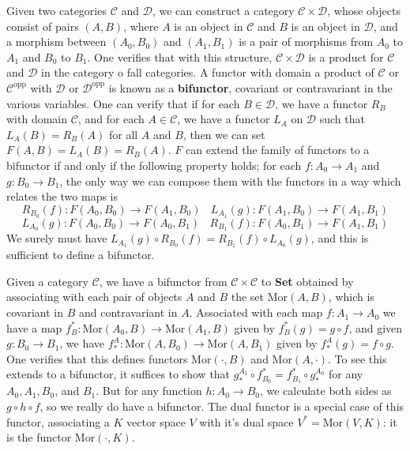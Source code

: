 Given two categories $\mathcal{C}$ and $\mathcal{D}$, we can construct a category $\mathcal{C} \times \mathcal{D}$, whose objects consist of pairs $(A,B)$, where $A$ is an object in $\mathcal{C}$ and $B$ is an object in $\mathcal{D}$, and a morphism between $(A_0, B_0)$ and $(A_1,B_1)$ is a pair of morphisms from $A_0$ to $A_1$ and $B_0$ to $B_1$. One verifies that with this structure, $\mathcal{C} \times \mathcal{D}$ is a product for $\mathcal{C}$ and $\mathcal{D}$ in the category o fall categories. A functor with domain a product of $\mathcal{C}$ or $\mathcal{C}^{\text{opp}}$ with $\mathcal{D}$ or $\mathcal{D}^{\text{opp}}$ is known as a {\bf bifunctor}, covariant or contravariant in the various variables. One can verify that if for each $B \in \mathcal{D}$, we have a functor $R_B$ with domain $\mathcal{C}$, and for each $A \in \mathcal{C}$, we have a functor $L_A$ on $\mathcal{D}$ such that $L_A(B) = R_B(A)$ for all $A$ and $B$, then we can set $F(A,B) = L_A(B) = R_B(A)$. $F$ can extend the family of functors to a bifunctor if and only if the following property holds; for each $f: A_0 \to A_1$ and $g: B_0 \to B_1$, the only way we can compose them with the functors in a way which relates the two maps is
%
\[ R_{B_0}(f): F(A_0,B_0) \to F(A_1,B_0)\ \ \ \ L_{A_1}(g): F(A_1,B_0) \to F(A_1,B_1) \]
\[ L_{A_0}(g): F(A_0,B_0) \to F(A_0,B_1)\ \ \ \ R_{B_1}(f): F(A_0,B_1) \to F(A_1,B_1) \]
%
We surely must have $L_{A_1}(g) \circ R_{B_0}(f) = R_{B_1}(f) \circ L_{A_0}(g)$, and this is sufficient to define a bifunctor.

\begin{example}
    Given a category $\mathcal{C}$, we have a bifunctor from $\mathcal{C} \times \mathcal{C}$ to {\bf Set} obtained by associating with each pair of objects $A$ and $B$ the set $\text{Mor}(A,B)$, which is covariant in $B$ and contravariant in $A$. Associated with each map $f: A_1 \to A_0$ we have a map $f^*_B: \text{Mor}(A_0,B) \to \text{Mor}(A_1,B)$ given by $f^*_B(g) = g \circ f$, and given $g: B_0 \to B_1$, we have $f_*^A: \text{Mor}(A,B_0) \to \text{Mor}(A,B_1)$ given by $f_*^A(g) = f \circ g$. One verifies that this defines functors $\text{Mor}(\cdot,B)$ and $\text{Mor}(A,\cdot)$. To see this extends to a bifunctor, it suffices to show that $g_*^{A_1} \circ f^*_{B_0} = f^*_{B_1} \circ g_*^{A_0}$ for any $A_0,A_1,B_0$, and $B_1$. But for any function $h: A_0 \to B_0$, we calculate both sides as $g \circ h \circ f$, so we really do have a bifunctor. The dual functor is a special case of this functor, associating a $K$ vector space $V$ with it's dual space $V^* = \text{Mor}(V,K)$: it is the functor $\text{Mor}(\cdot,K)$.
\end{example}

